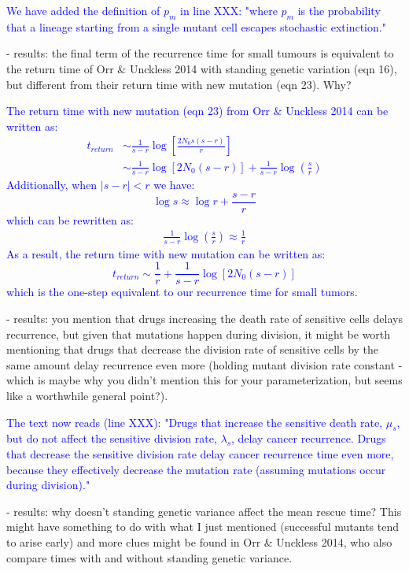 \documentclass[12pt]{extarticle}
\begin{document}
\textcolor{blue}{%
We have added the definition of $p_m$ in line XXX: "where $p_m$ is the probability that a lineage starting from a single mutant cell escapes stochastic extinction."
} 

- results: the final term of the recurrence time for small tumours is equivalent to the return time of Orr $\&$ Unckless 2014 with standing genetic variation (eqn 16), but different from their return time with new mutation (eqn 23). Why?

\textcolor{blue}{The return time with new mutation (eqn 23) from Orr $\&$ Unckless 2014 can be written as:
\begin{align*}
t_{return}&\sim\frac{1}{s-r}\log\left[\frac{2N_0s(s-r)}{r}\right]\\
&\sim \frac{1}{s-r}\log[2N_0(s-r)]+\frac{1}{s-r}\log\left(\frac{s}{r}\right)
\end{align*}
Additionally, when $|s-r|<r$ we have:
\begin{equation*}
\log s \approx \log r +\frac{s-r}{r}
\end{equation*}
which can be rewritten as:
\begin{align*}
\frac{1}{s-r}\log\left(\frac{s}{r}\right)\approx \frac{1}{r}
\end{align*}
As a result, the return time with new mutation can be written as:
\begin{equation*}
t_{return}\sim \frac{1}{r}+\frac{1}{s-r}\log[2N_0(s-r)]
\end{equation*}
which is the one-step equivalent to our recurrence time for small tumors.
} 

- results: you mention that drugs increasing the death rate of sensitive cells delays recurrence, but given that mutations happen during division, it might be worth mentioning that drugs that decrease the division rate of sensitive cells by the same amount delay recurrence even more (holding mutant division rate constant - which is maybe why you didn't mention this for your parameterization, but seems like a worthwhile general point?).

\textcolor{blue}{%
The text now reads (line XXX): "Drugs that increase the sensitive death rate, $\mu_s$, but do not affect the sensitive division rate, $\lambda_s$, delay cancer recurrence. Drugs that decrease the sensitive division rate delay cancer recurrence time even more, because they effectively decrease the mutation rate (assuming mutations occur during division)."
}

- results: why doesn't standing genetic variance affect the mean rescue time? This might have something to do with what I just mentioned (successful mutants tend to arise early) and more clues might be found in Orr $\&$ Unckless 2014, who also compare times with and without standing genetic variance.
\end{document}
